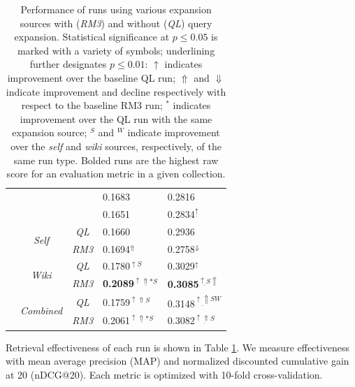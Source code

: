\documentclass{sig-alternate}
\begin{document}
\begin{table}
\begin{tabular}{|c|c|c|l|l|}
\rule{0pt}{2.5ex} \multirow{8}{*}{wt10g} & \cellcolor{gray!50} & \cellcolor{gray!50}{\it QL} & \cellcolor{gray!50}0.1683 & \cellcolor{gray!50}0.2816 \\ \cline{3-5}
\rule{0pt}{2.5ex} & \cellcolor{gray!50} \multirow{-2}{*}{\it Baseline} & \cellcolor{gray!50}{\it RM3} & \cellcolor{gray!50}0.1651 & \cellcolor{gray!50}0.2834$^{\underline{\uparrow}}$ \\ \cline{2-5}
\rule{0pt}{2.5ex} & \multirow{2}{*}{\it Self} & {\it QL} & 0.1660 & 0.2936 \\ \cline{3-5}
\rule{0pt}{2.5ex} & & {\it RM3} & 0.1694$^\Uparrow$ & 0.2758$^\Downarrow$ \\ \cline{2-5}
\rule{0pt}{2.5ex} & \multirow{2}{*}{\it Wiki} & {\it QL} & 0.1780$^{\uparrow \underline{S}}$ & 0.3029$^\uparrow$ \\ \cline{3-5}
\rule{0pt}{2.5ex} & & {\it RM3} & \textbf{0.2089}$^{\underline{\uparrow\Uparrow *S}}$ & \textbf{0.3085}$^{\underline{\uparrow S}\Uparrow}$ \\ \cline{2-5}
\rule{0pt}{2.5ex} & \multirow{2}{*}{\it Combined} & {\it QL} & 0.1759$^{\uparrow\Uparrow S}$ & 0.3148$^{\underline{\uparrow\Uparrow} SW}$ \\ \cline{3-5}
\rule{0pt}{2.5ex} & & {\it RM3} & 0.2061$^{\underline{\uparrow\Uparrow *S}}$ & 0.3082$^{\underline{\uparrow\Uparrow S}}$ \\ \hline
\end{tabular}
\caption{Performance of runs using various expansion sources with (\textit{RM3}) and without (\textit{QL}) query expansion. Statistical significance at $p \leq 0.05$ is marked with a variety of symbols; underlining further designates $p \leq 0.01$: $\uparrow$ indicates improvement over the baseline QL run; $\Uparrow$ and $\Downarrow$ indicate improvement and decline respectively with respect to the baseline RM3 run; $^{*}$ indicates improvement over the QL run with the same expansion source; $^{S}$ and $^{W}$ indicate improvement over the \textit{self} and \textit{wiki} sources, respectively, of the same run type. Bolded runs are the highest raw score for an evaluation metric in a given collection.}
\label{table.effectiveness}
\end{table}

Retrieval effectiveness of each run is shown in Table \ref{table.effectiveness}. We measure effectiveness with mean average precision (MAP) and normalized discounted cumulative gain at 20 (nDCG@20). Each metric is optimized with 10-fold cross-validation.
\end{document}
